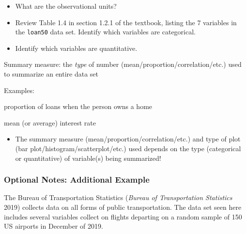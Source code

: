 \documentclass[
]{report}
\providecommand{\tightlist}{%
  \setlength{\itemsep}{0pt}\setlength{\parskip}{0pt}}
\newcommand{\rgi}{\hspace{24pt}}  %
\begin{document}
\begin{itemize}
\tightlist
\item
  What are the observational units?
\end{itemize}

\vspace{0.2in}

\begin{itemize}
\tightlist
\item
  Review Table 1.4 in section 1.2.1 of the textbook, listing the 7 variables in the \texttt{loan50} data set. Identify which variables are categorical.
\end{itemize}

\vspace{0.2in}

\begin{itemize}
\tightlist
\item
  Identify which variables are quantitative.
\end{itemize}

\vspace{0.2in}

Summary measure: the \emph{type} of number (mean/proportion/correlation/etc.) used to summarize an entire data set

\rgi Examples:

\rgi \rgi proportion of loans when the person owns a home

\vspace{0.3in}

\rgi \rgi mean (or average) interest rate

\vspace{0.3in}

\begin{itemize}
\tightlist
\item
  The summary measure (mean/proportion/correlation/etc.) and type of plot (bar plot/histogram/scatterplot/etc.) used depends on the type (categorical or quantitative) of variable(s) being summarized!
\end{itemize}


\subsubsection*{Optional Notes: Additional Example}\label{optional-notes-additional-example}

The Bureau of Transportation Statistics (\emph{Bureau of Transportation Statistics} 2019) collects data on all forms of public transportation. The data set seen here includes several variables collect on flights departing on a random sample of 150 US airports in December of 2019.
\end{document}

